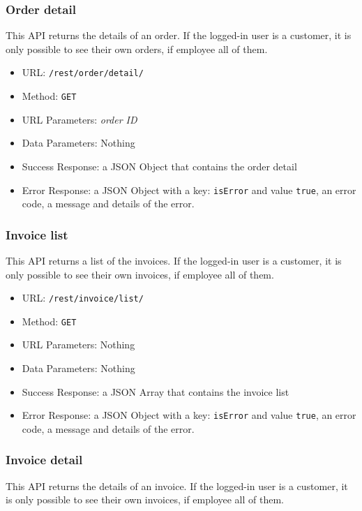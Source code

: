 \subsubsection*{Order detail}

This API returns the details of an order.
If the logged-in user is a customer, it is only possible to see their own orders, if employee all of them.

\begin{itemize}
    \item URL: \texttt{/rest/order/detail/}
    \item Method: \texttt{GET}
    \item URL Parameters: \textit{order ID}
    \item Data Parameters: Nothing
    \item Success Response: a JSON Object that contains the order detail
    \item Error Response: a JSON Object with a key: \texttt{isError}  and value \texttt{true}, an error code, a message and details of the error.
\end{itemize}


\subsubsection*{Invoice list}

This API returns a list of the invoices.
If the logged-in user is a customer, it is only possible to see their own invoices, if employee all of them.

\begin{itemize}
    \item URL: \texttt{/rest/invoice/list/}
    \item Method: \texttt{GET}
    \item URL Parameters: Nothing
    \item Data Parameters: Nothing
    \item Success Response:  a JSON Array that contains the invoice list
    \item Error Response: a JSON Object with a key: \texttt{isError}  and value \texttt{true}, an error code, a message and details of the error.
\end{itemize}

\subsubsection*{Invoice detail}

This API returns the details of an invoice.
If the logged-in user is a customer, it is only possible to see their own invoices, if employee all of them.

